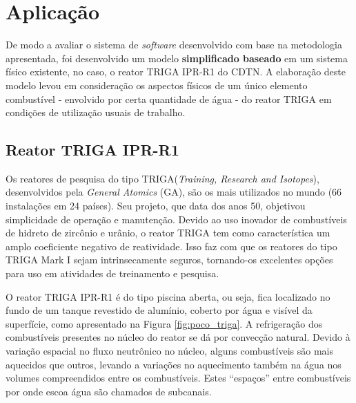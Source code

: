 \chapter{Aplicação}
\label{chap:aplicacao}

De modo a avaliar o sistema de \textit{software} desenvolvido com base na metodologia apresentada, 
foi desenvolvido um modelo \textbf{simplificado baseado} em um sistema físico existente, no caso,
o reator TRIGA IPR-R1 do CDTN. A elaboração deste modelo levou em consideração os aspectos físicos
de um único elemento combustível - envolvido por certa quantidade de água - do reator TRIGA
em condições de utilização usuais de trabalho.

\section{Reator TRIGA IPR-R1}
\label{sec:triga}


Os reatores de pesquisa do tipo TRIGA\textregistered (\textit{Training, Research and Isotopes}),
desenvolvidos pela \textit{General Atomics} (GA), são os mais utilizados
no mundo (66 instalações em 24 países). Seu projeto, que data dos anos 50,
objetivou simplicidade de operação e manutenção. Devido ao uso inovador de combustíveis de hidreto
de zircônio e urânio, o reator TRIGA tem como característica um amplo coeficiente negativo
de reatividade. %
Isso faz com que os reatores do tipo TRIGA Mark I sejam
intrinsecamente seguros, tornando-os excelentes opções para uso em atividades de treinamento
e pesquisa.


O reator TRIGA IPR-R1 é do tipo piscina aberta, ou seja, fica localizado no fundo de um tanque revestido de alumínio,
coberto por água e visível da superfície, como apresentado na Figura \ref{fig:poco_triga}.
A refrigeração dos combustíveis presentes no núcleo do reator se dá por convecção natural. Devido à variação espacial
no fluxo neutrônico no núcleo, alguns combustíveis são mais aquecidos que outros, levando a variações
no aquecimento também na água nos volumes compreendidos entre os combustíveis. Estes ``espaços'' entre
combustíveis por onde escoa água são chamados de subcanais.

